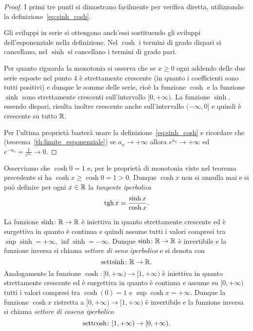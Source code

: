%
\begin{proof}
I primi tre punti si dimostrano facilmente per verifica diretta,
utilizzando la definizione~\eqref{eq:sinh_cosh}.

Gli sviluppi in serie si ottengono anch'essi sostituendo
gli sviluppi dell'esponenziale nella definizione.
Nel $\cosh$ i termini di grado dispari si cancellano, nel $\sinh$ si cancellano
i termini di grado pari.

Per quanto riguarda la monotonia si osserva che se $x\ge 0$ ogni
addendo delle due serie esposte nel punto 4 è strettamente crescente
(in quanto i coefficienti sono tutti positivi) e dunque le somme delle serie,
cioè la funzione $\cosh$ e la funzione $\sinh$ sono strettamente crescenti
sull'intervallo $[0,+\infty)$. La funzione $\sinh$, essendo dispari,
risulta inoltre crescente anche sull'intervallo $(-\infty,0]$ e quindi
è crescente su tutto $\mathbb R$.

Per l'ultima proprietà basterà usare la definizione~\eqref{eq:sinh_cosh}
e ricordare che (teorema~\ref{th:limite_esponenziale})
se $a_n\to +\infty$ allora
$e^{a_n}\to +\infty$ ed $e^{-a_n}=\frac{1}{e^{a_n}} \to 0$.
\end{proof}

Osserviamo che $\cosh 0 = 1$ e, per le proprietà di monotonia viste nel teorema
precedente si ha $\cosh x \ge \cosh 0 = 1 > 0$. Dunque $\cosh x$ non si annulla
mai e si può definire per ogni $x\in \mathbb R$ la \emph{tangente iperbolica}
\mymargin{$\tanh$}
\[
 \operatorname{tgh} x = \frac{\sinh x}{\cosh x}.
\]

La funzione $\sinh\colon \mathbb R\to\mathbb R$ è iniettiva in quanto strettamente crescente ed
è surgettiva in quanto è continua e quindi assume tutti i valori compresi tra
$\sup \sinh = +\infty$, $\inf \sinh = -\infty$. Dunque $\sinh\colon \mathbb R \to \mathbb R$
è invertibile e la funzione inversa si chiama \emph{settore di seno iperbolico}
e si denota con
\mymargin{$\settsinh$}
\[
  \operatorname{settsinh} \colon \mathbb R \to \mathbb R.
\]
Analogamente la funzione $\cosh\colon [0,+\infty)\to [1,+\infty)$ è
iniettiva in quanto strettamente crescente ed è surgettiva in quanto
è continua e assume su $[0,+\infty)$ tutti i valori compresi tra $\cosh(0)=1$ e
$\sup \cosh x = +\infty$.
Dunque la funzione $\cosh x$ ristretta a $[0,+\infty)\to [1,+\infty)$
è invertibile e la funzione inversa si chiama \emph{settore di coseno iperbolico}
\mymargin{$\settcosh$}
\[
 \operatorname{settcosh} \colon [1,+\infty)\to [0,+\infty).
\]

